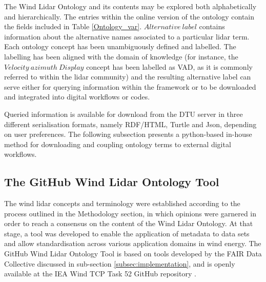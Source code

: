 \documentclass[remotesensing,article,submit,pdftex,moreauthors]{Definitions/mdpi}
\begin{document}
The Wind Lidar Ontology and its contents may be explored both alphabetically and hierarchically.
The entries within the online version of the ontology contain the fields included in Table \ref{Ontology_var}. $Alternative~label$ contains information about the alternative names associated to a particular lidar term. Each ontology concept has been unambiguously defined and labelled. The labelling has been aligned with the domain of knowledge (for instance, the $Velocity~azimuth~Display$ concept has been labelled as VAD, as it is commonly referred to within the lidar community) and the resulting alternative label can serve either for querying information within the framework or to be downloaded and integrated into digital workflows or codes. 

Queried information is available for download from the DTU server in three different serialisation formats, namely RDF/HTML, Turtle and Json, depending on user preferences.
The following subsection presents a python-based in-house method for downloading and coupling ontology terms to external digital workflows. 

\subsection{The GitHub Wind Lidar Ontology Tool}
\label{GitTool}
The wind lidar concepts and terminology were established according to the process outlined in the Methodology section,
in which opinions were garnered in order to reach a consensus on the content of the Wind Lidar Ontology.
At that stage, a tool was developed to enable the application of metadata to data sets and
allow standardisation across various application domains in wind energy.
The GitHub Wind Lidar Ontology Tool is based on tools developed by the FAIR Data Collective discussed in sub-section \ref{subsec:implementation}, and is openly available at the IEA Wind TCP Task 52 GitHub repository \cite{IEA_Wind_TCP_Task_52_GitHub_repository}.
\end{document}
